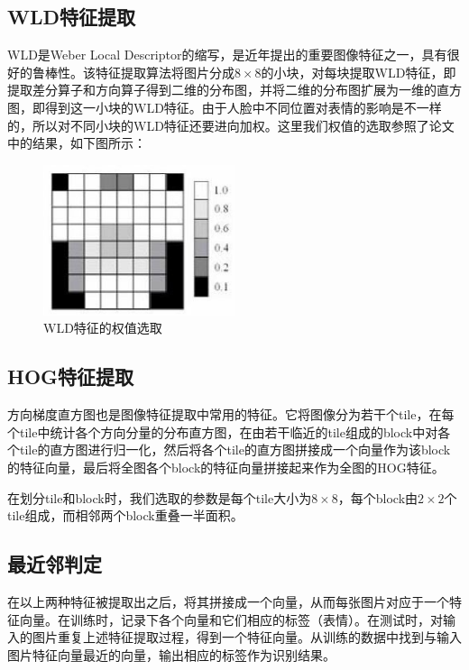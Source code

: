 \documentclass[UTF8]{ctexart}
\begin{document}
\subsection{WLD特征提取}

WLD是Weber Local Descriptor的缩写，是近年提出的重要图像特征之一，具有很好的鲁棒性。该特征提取算法将图片分成$8\times 8$的小块，对每块提取WLD特征，即提取差分算子和方向算子得到二维的分布图，并将二维的分布图扩展为一维的直方图，即得到这一小块的WLD特征。由于人脸中不同位置对表情的影响是不一样的，所以对不同小块的WLD特征还要进向加权。这里我们权值的选取参照了论文\cite{wang2013feature}中的结果，如下图所示：
\begin{figure}[ht]
  \centering
  \includegraphics[width=0.5\textwidth]{WLD.jpg}
  \caption{WLD特征的权值选取}\label{fig:wldweight}
\end{figure}

\subsection{HOG特征提取}

方向梯度直方图也是图像特征提取中常用的特征。它将图像分为若干个tile，在每个tile中统计各个方向分量的分布直方图，在由若干临近的tile组成的block中对各个tile的直方图进行归一化，然后将各个tile的直方图拼接成一个向量作为该block的特征向量，最后将全图各个block的特征向量拼接起来作为全图的HOG特征。

在划分tile和block时，我们选取的参数是每个tile大小为$8\times 8$，每个block由$2\times 2$个tile组成，而相邻两个block重叠一半面积。

\subsection{最近邻判定}

在以上两种特征被提取出之后，将其拼接成一个向量，从而每张图片对应于一个特征向量。在训练时，记录下各个向量和它们相应的标签（表情）。在测试时，对输入的图片重复上述特征提取过程，得到一个特征向量。从训练的数据中找到与输入图片特征向量最近的向量，输出相应的标签作为识别结果。
\end{document}
